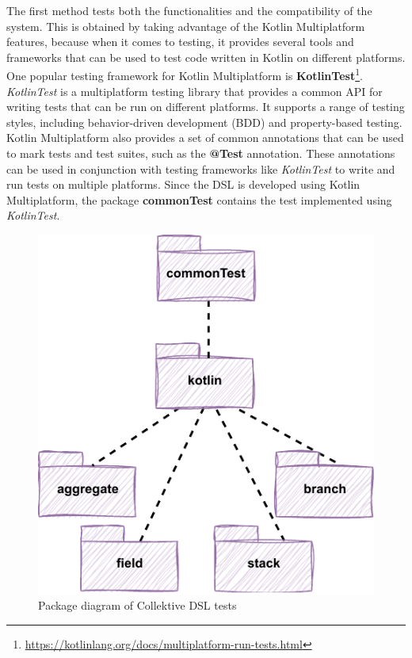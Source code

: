 The first method tests both the functionalities and the compatibility of the system. This is obtained by taking advantage of the Kotlin Multiplatform features, because when it comes to testing, it provides several tools and frameworks that can be used to test code written in Kotlin on different platforms.\newline
One popular testing framework for Kotlin Multiplatform is \textbf{KotlinTest}\footnote{\url{https://kotlinlang.org/docs/multiplatform-run-tests.html}}. \textit{KotlinTest} is a multiplatform testing library that provides a common API for writing tests that can be run on different platforms. It supports a range of testing styles, including behavior-driven development (BDD) and property-based testing.\newline
Kotlin Multiplatform also provides a set of common annotations that can be used to mark tests and test suites, such as the \textbf{@Test} annotation. These annotations can be used in conjunction with testing frameworks like \textit{KotlinTest} to write and run tests on multiple platforms.\newline
Since the DSL is developed using Kotlin Multiplatform, the package \textbf{commonTest} contains the test implemented using \textit{KotlinTest}.\newline
\begin{figure}[!ht]
    \centering
    \includegraphics[scale=1.1]{document/chapters/4-collektive/images/common_test_package_diagram.pdf}
    \caption{Package diagram of Collektive DSL tests}
    \label{fig:common_test_package_diagram}
\end{figure}

